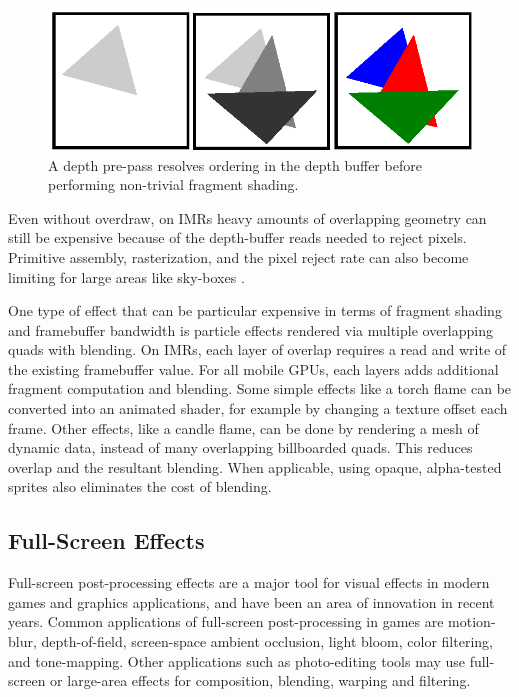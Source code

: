 \begin{figure}[h!]
    \caption{A depth pre-pass resolves ordering in the depth buffer before performing non-trivial fragment shading.}
    \centering
        \includegraphics{mccaffreyFigs/depth_pre_pass.eps}
\end{figure}

Even without overdraw, on IMRs heavy amounts of overlapping geometry can still be
expensive because of the depth-buffer reads needed to reject pixels.  Primitive
assembly, rasterization, and the pixel reject rate can also become limiting for
large areas like sky-boxes \cite{Pranckevicius11a}.

One type of effect that can be particular expensive in terms of fragment
shading and framebuffer bandwidth is particle effects rendered via multiple
overlapping quads with blending.  On IMRs, each layer of overlap requires a
read and
 write of the existing framebuffer value.  For all mobile GPUs, each
layers adds additional fragment computation
 and blending.  Some simple
effects
 like a torch flame can be converted into an animated shader, for
example by
 changing a texture offset each frame.  Other effects, like a
candle flame, can
 be done by rendering a mesh of dynamic data, instead of
many overlapping billboarded quads.  This
 reduces overlap and the resultant
blending.  When applicable, using opaque, alpha-tested sprites also eliminates
the cost of blending.

\subsection {Full-Screen Effects}\label{Jon-McCaffrey-Full-Screen-Effects}
Full-screen post-processing effects are a major tool for visual effects in
modern games and graphics applications, and have been an area of innovation in
recent years.   Common applications of full-screen post-processing in games are
motion-blur, depth-of-field, screen-space ambient occlusion, light bloom, color
filtering, and tone-mapping.  Other applications such as photo-editing tools
may use full-screen or large-area effects for composition, blending, warping
and filtering.

